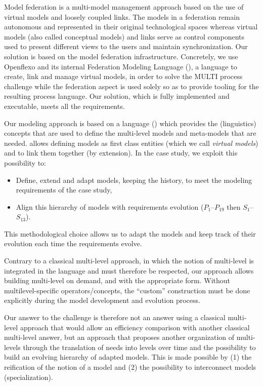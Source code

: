 Model federation is a multi-model management approach based on the use of virtual models and loosely coupled links. The models in a federation remain autonomous and represented in their original technological spaces whereas virtual models (also called conceptual models) and links serve as control components used to present different views to the users and maintain synchronization.
Our solution is based on the model federation infrastructure. Concretely, we use Openflexo and its internal Federation Modeling Language (\FML), a language to create, link and manage virtual models, in order to solve the MULTI process challenge while the federation aspect is used solely so as to provide tooling for the resulting process language. Our solution, which is fully implemented and executable, meets all the requirements.

Our modeling approach is based on a language (\FML) which provides the (linguistics) concepts that are used to define the multi-level models and meta-models that are needed. \FML allows defining models as first class entities (which we call \emph{virtual models}) and to link them together (by extension). In the \mpc case study, we exploit this possibility to:
\begin{itemize}
    \item Define, extend and adapt models, keeping the history, to meet the %
    modeling requirements of the case study,
    \item Align this hierarchy of models with requirements evolution
      ($P_1$--$P_{19}$ then $S_1$--$S_{13}$).
\end{itemize}
This methodological choice allows us to adapt the models and keep track of their evolution each time the requirements evolve.

Contrary to a classical multi-level approach, in which the notion of
multi-level is integrated in the language and must therefore be respected, our
approach allows building multi-level on demand, and with the appropriate form.
Without multilevel-specific operators/concepts, the \enquote{custom}
construction must be done explicitly during the model development and evolution
process.

Our answer to the challenge is therefore not an answer using a classical multi-level approach that would allow an efficiency comparison with another classical multi-level answer, but an approach that proposes another organization of multi-levels through the translation of needs into levels over time and the possibility to build an evolving hierarchy of adapted models. This is made possible by (1) the reification of the notion of a model and (2) the possibility to interconnect models (specialization).%


